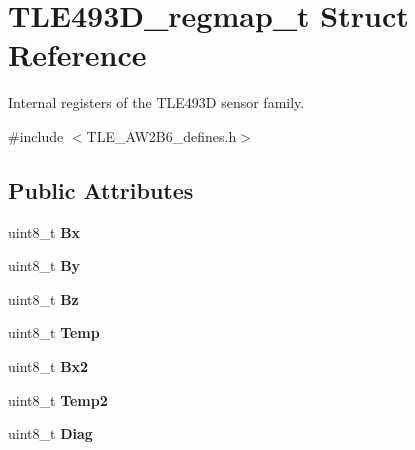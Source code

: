 \hypertarget{struct_t_l_e493_d__regmap__t}{}\section{T\+L\+E493\+D\+\_\+regmap\+\_\+t Struct Reference}
\label{struct_t_l_e493_d__regmap__t}


Internal registers of the T\+L\+E493D sensor family.  




{\ttfamily \#include $<$T\+L\+E\+\_\+\+A\+W2\+B6\+\_\+defines.\+h$>$}

\subsection*{Public Attributes}
\begin{DoxyCompactItemize}
\item 
\mbox{\label{struct_t_l_e493_d__regmap__t_a946e51dac351bc8937e27a158580b235}} 
uint8\+\_\+t {\bfseries Bx}
\item 
\mbox{\label{struct_t_l_e493_d__regmap__t_aea886bf961abaa1e645c397e09f869f8}} 
uint8\+\_\+t {\bfseries By}
\item 
\mbox{\label{struct_t_l_e493_d__regmap__t_a930dfbf72cd274ed4e75d1223b879fc7}} 
uint8\+\_\+t {\bfseries Bz}
\item 
\mbox{\label{struct_t_l_e493_d__regmap__t_a1b27e4c60cc2bf971b7e2db727082591}} 
uint8\+\_\+t {\bfseries Temp}
\item 
\mbox{\label{struct_t_l_e493_d__regmap__t_a254250832c43207666221f2b8a831815}} 
uint8\+\_\+t {\bfseries Bx2}
\item 
\mbox{\label{struct_t_l_e493_d__regmap__t_afe17596fbaa9868671dd1d64b54b05b1}} 
uint8\+\_\+t {\bfseries Temp2}
\item 
\mbox{\label{struct_t_l_e493_d__regmap__t_a1adc1b1354d5034134f6f910e3f2eb1a}} 
uint8\+\_\+t {\bfseries Diag}
\item 
\mbox{\label{struct_t_l_e493_d__regmap__t_af5ce77690951cce46431354b8c53b4f6}} 

\end{DoxyCompactItemize}
